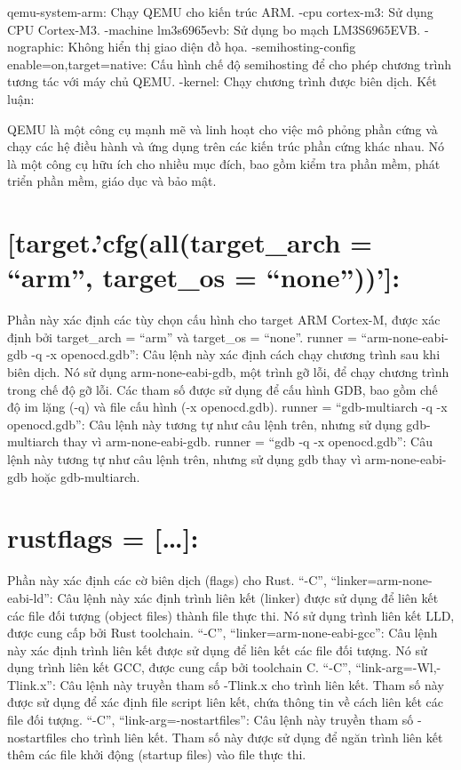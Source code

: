 \documentclass[
  letterpaper,
  DIV=11,
  numbers=noendperiod]{scrreprt}
\begin{document}
qemu-system-arm: Chạy QEMU cho kiến trúc ARM. -cpu cortex-m3: Sử dụng
CPU Cortex-M3. -machine lm3s6965evb: Sử dụng bo mạch LM3S6965EVB.
-nographic: Không hiển thị giao diện đồ họa. -semihosting-config
enable=on,target=native: Cấu hình chế độ semihosting để cho phép chương
trình tương tác với máy chủ QEMU. -kernel: Chạy chương trình được biên
dịch. Kết luận:

QEMU là một công cụ mạnh mẽ và linh hoạt cho việc mô phỏng phần cứng và
chạy các hệ điều hành và ứng dụng trên các kiến trúc phần cứng khác
nhau. Nó là một công cụ hữu ích cho nhiều mục đích, bao gồm kiểm tra
phần mềm, phát triển phần mềm, giáo dục và bảo mật.

\section{{[}target.'cfg(all(target\_arch = ``arm'', target\_os =
``none''))'{]}:}\label{target.cfgalltarget_arch-arm-target_os-none}

Phần này xác định các tùy chọn cấu hình cho target ARM Cortex-M, được
xác định bởi target\_arch = ``arm'' và target\_os = ``none''. runner =
``arm-none-eabi-gdb -q -x openocd.gdb'': Câu lệnh này xác định cách chạy
chương trình sau khi biên dịch. Nó sử dụng arm-none-eabi-gdb, một trình
gỡ lỗi, để chạy chương trình trong chế độ gỡ lỗi. Các tham số được sử
dụng để cấu hình GDB, bao gồm chế độ im lặng (-q) và file cấu hình (-x
openocd.gdb). runner = ``gdb-multiarch -q -x openocd.gdb'': Câu lệnh này
tương tự như câu lệnh trên, nhưng sử dụng gdb-multiarch thay vì
arm-none-eabi-gdb. runner = ``gdb -q -x openocd.gdb'': Câu lệnh này
tương tự như câu lệnh trên, nhưng sử dụng gdb thay vì arm-none-eabi-gdb
hoặc gdb-multiarch.

\section{rustflags = {[}\ldots{]}:}\label{rustflags}

Phần này xác định các cờ biên dịch (flags) cho Rust. ``-C'',
``linker=arm-none-eabi-ld'': Câu lệnh này xác định trình liên kết
(linker) được sử dụng để liên kết các file đối tượng (object files)
thành file thực thi. Nó sử dụng trình liên kết LLD, được cung cấp bởi
Rust toolchain. ``-C'', ``linker=arm-none-eabi-gcc'': Câu lệnh này xác
định trình liên kết được sử dụng để liên kết các file đối tượng. Nó sử
dụng trình liên kết GCC, được cung cấp bởi toolchain C. ``-C'',
``link-arg=-Wl,-Tlink.x'': Câu lệnh này truyền tham số -Tlink.x cho
trình liên kết. Tham số này được sử dụng để xác định file script liên
kết, chứa thông tin về cách liên kết các file đối tượng. ``-C'',
``link-arg=-nostartfiles'': Câu lệnh này truyền tham số -nostartfiles
cho trình liên kết. Tham số này được sử dụng để ngăn trình liên kết thêm
các file khởi động (startup files) vào file thực thi.
\end{document}
